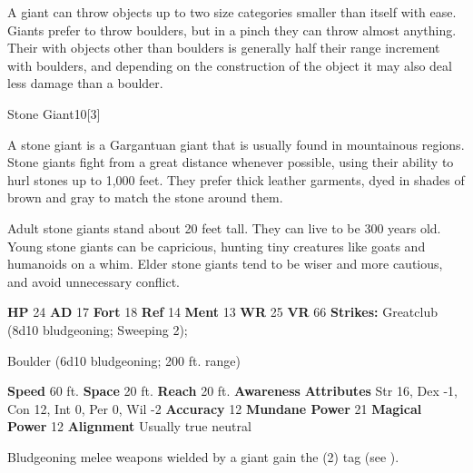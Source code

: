         A giant can throw objects up to two size categories smaller than itself with ease.
        Giants prefer to throw boulders, but in a pinch they can throw almost anything.
        Their  with objects other than boulders is generally half their range increment with boulders, and depending on the construction of the object it may also deal less damage than a boulder.
  

  \begin{monsubsection}{Stone Giant}{10}[3]
    \vspace{-1em}\vspace{-1em}
    \vspace{0em}

    
          A stone giant is a Gargantuan giant that is usually found in mountainous regions.
          Stone giants fight from a great distance whenever possible, using their ability to hurl stones up to 1,000 feet.
          They prefer thick leather garments, dyed in shades of brown and gray to match the stone around them.
        
          Adult stone giants stand about 20 feet tall.
          They can live to be 300 years old.
          Young stone giants can be capricious, hunting tiny creatures like goats and humanoids on a whim.
          Elder stone giants tend to be wiser and more cautious, and avoid unnecessary conflict.
        

    \begin{spellcontent}
      \begin{spelltargetinginfo}
        \pari \textbf{HP} 24 \monsep
          \textbf{AD} 17 \monsep
          \textbf{Fort} 18 \monsep
          \textbf{Ref} 14 \monsep
          \textbf{Ment} 13
        \pari \textbf{WR} 25 \monsep
        \textbf{VR} 66
        \pari \textbf{Strikes:}
            Greatclub  (8d10 bludgeoning; Sweeping 2);
\par Boulder  (6d10 bludgeoning; 200 ft. range)
      \end{spelltargetinginfo}
    \end{spellcontent}
    \begin{monsterfooter}
      \pari \textbf{Speed} 60 ft. \monsep
        \textbf{Space} 20 ft. \monsep
        \textbf{Reach} 20 ft.
      \pari \textbf{Awareness} 
      \pari \textbf{Attributes}
        Str 16, Dex -1,
        Con 12, Int 0,
        Per 0, Wil -2
      \pari \textbf{Accuracy} 12 \monsep
        \textbf{Mundane Power} 21 \monsep
      \textbf{Magical Power} 12
      \pari \textbf{Alignment} Usually true neutral
    \end{monsterfooter}
  \end{monsubsection}
        Bludgeoning melee weapons wielded by a giant gain the  (2) tag (see ).
      
